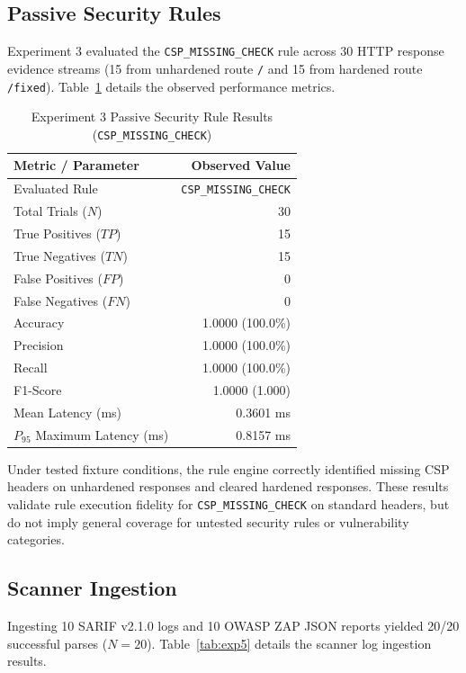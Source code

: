 \documentclass[conference]{IEEEtran}
\begin{document}
\subsection{Passive Security Rules}
Experiment 3 evaluated the \texttt{CSP\_MISSING\_CHECK} rule across 30 HTTP response evidence streams (15 from unhardened route \texttt{/} and 15 from hardened route \texttt{/fixed}). Table~\ref{tab:exp3} details the observed performance metrics.

\begin{table}[t]
\caption{Experiment 3 Passive Security Rule Results (\texttt{CSP\_MISSING\_CHECK})}
\label{tab:exp3}
\centering
\begin{tabular}{l r}
\toprule
\textbf{Metric / Parameter} & \textbf{Observed Value} \\
\midrule
Evaluated Rule & \texttt{CSP\_MISSING\_CHECK} \\
Total Trials ($N$) & 30 \\
True Positives ($TP$) & 15 \\
True Negatives ($TN$) & 15 \\
False Positives ($FP$) & 0 \\
False Negatives ($FN$) & 0 \\
Accuracy & 1.0000 (100.0\%) \\
Precision & 1.0000 (100.0\%) \\
Recall & 1.0000 (100.0\%) \\
F1-Score & 1.0000 (1.000) \\
Mean Latency (ms) & 0.3601 ms \\
$P_{95}$ Maximum Latency (ms) & 0.8157 ms \\
\bottomrule
\end{tabular}
\end{table}

Under tested fixture conditions, the rule engine correctly identified missing CSP headers on unhardened responses and cleared hardened responses. These results validate rule execution fidelity for \texttt{CSP\_MISSING\_CHECK} on standard headers, but do not imply general coverage for untested security rules or vulnerability categories.

\subsection{Scanner Ingestion}
Ingesting 10 SARIF v2.1.0 logs and 10 OWASP ZAP JSON reports yielded 20/20 successful parses ($N=20$). Table~\ref{tab:exp5} details the scanner log ingestion results.
\end{document}
